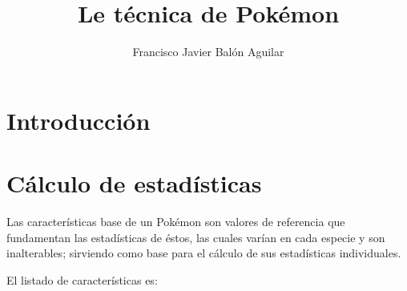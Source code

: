 \documentclass[a4paper, 11pt, titlepage]{article}
\title{Le técnica de Pokémon}
\author{Francisco Javier Balón Aguilar}
\begin{document}
\maketitle
\renewcommand{\contentsname}{Índice}
\tableofcontents
\newpage

\section{Introducción}\label{introduccion}

\section{Cálculo de estadísticas}

    Las características base de un Pokémon son valores de referencia que fundamentan 
    las estadísticas de éstos, las cuales varían en cada especie y son inalterables; sirviendo 
    como base para el cálculo de sus estadísticas individuales.

    El listado de características es:
\end{document}
